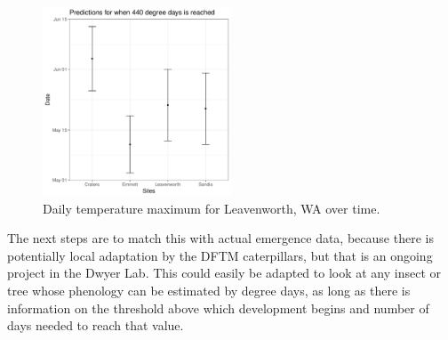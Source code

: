 \documentclass[12pt,letter]{article}
\begin{document}
\begin{figure}
\centering
\includegraphics[width = 0.5\textwidth]{../Plots/2019Pred_KD.pdf}
\caption{Daily temperature maximum for Leavenworth, WA over time.}
\label{fig:DDbysite}
\end{figure}

The next steps are to match this with actual emergence data, because there is potentially local adaptation by the DFTM caterpillars, but that is an ongoing project in the Dwyer Lab. This could easily be adapted to look at any insect or tree whose phenology can be estimated by degree days, as long as there is information on the threshold above which development begins and number of days needed to reach that value.



\pagebreak
%
%
\end{document}
